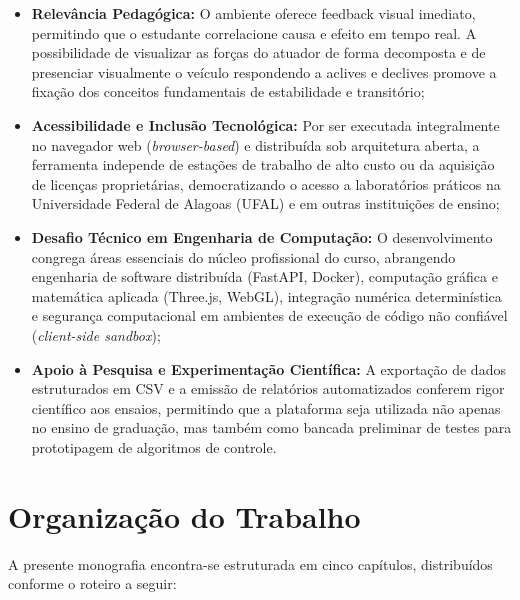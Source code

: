 \begin{itemize}
    \item \textbf{Relevância Pedagógica:} O ambiente oferece feedback visual imediato, permitindo que o estudante correlacione causa e efeito em tempo real. A possibilidade de visualizar as forças do atuador de forma decomposta e de presenciar visualmente o veículo respondendo a aclives e declives promove a fixação dos conceitos fundamentais de estabilidade e transitório;
    \item \textbf{Acessibilidade e Inclusão Tecnológica:} Por ser executada integralmente no navegador web (\textit{browser-based}) e distribuída sob arquitetura aberta, a ferramenta independe de estações de trabalho de alto custo ou da aquisição de licenças proprietárias, democratizando o acesso a laboratórios práticos na Universidade Federal de Alagoas (UFAL) e em outras instituições de ensino;
    \item \textbf{Desafio Técnico em Engenharia de Computação:} O desenvolvimento congrega áreas essenciais do núcleo profissional do curso, abrangendo engenharia de software distribuída (FastAPI, Docker), computação gráfica e matemática aplicada (Three.js, WebGL), integração numérica determinística e segurança computacional em ambientes de execução de código não confiável (\textit{client-side sandbox});
    \item \textbf{Apoio à Pesquisa e Experimentação Científica:} A exportação de dados estruturados em CSV e a emissão de relatórios automatizados conferem rigor científico aos ensaios, permitindo que a plataforma seja utilizada não apenas no ensino de graduação, mas também como bancada preliminar de testes para prototipagem de algoritmos de controle.
\end{itemize}

\section{Organização do Trabalho}
\label{sec:organizacao}

A presente monografia encontra-se estruturada em cinco capítulos, distribuídos conforme o roteiro a seguir:

